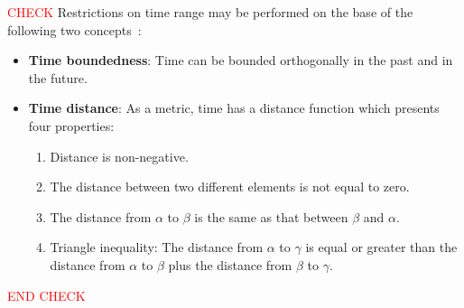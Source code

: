 

\textcolor{red}{CHECK}
Restrictions on time range may be performed on the base of the following two concepts~\cite{Jensen94thetsql2}:
\begin{itemize}
\item
\textbf{Time boundedness}: Time can be bounded orthogonally in the past and in the future.
\item
\textbf{Time distance}: As a metric, time has a distance function which presents four properties:
\begin{enumerate}
\item
Distance is non-negative.
\item
The distance between two different elements is not equal to zero.
\item
The distance from $\alpha$ to $\beta$ is the same as that between $\beta$ and $\alpha$.
\item
Triangle inequality: The distance from $\alpha$ to $\gamma$ is equal or greater than the distance from $\alpha$ to $\beta$ plus the distance from $\beta$ to $\gamma$.
\end{enumerate}
\end{itemize}
\textcolor{red}{END CHECK}


